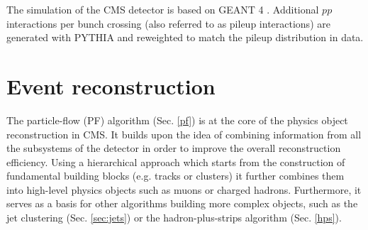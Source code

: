 The simulation of the CMS detector is based on GEANT 4 \cite{GEANT4:2002zbu}. Additional $pp$ interactions per bunch crossing (also referred to as pileup interactions) are generated with PYTHIA and reweighted to match the pileup distribution in data. 

\section{Event reconstruction}\label{sec:reco}
The particle-flow (PF) algorithm (Sec. \ref{pf}) is at the core of the physics object reconstruction in CMS. It builds upon the idea of combining information from all the subsystems of the detector in order to improve the overall reconstruction efficiency. Using a hierarchical approach which starts from the construction of fundamental building blocks (e.g. tracks or clusters) it further combines them into high-level physics objects such as muons or charged hadrons. Furthermore, it serves as a basis for other algorithms building more complex objects, such as the jet clustering (Sec. \ref{sec:jets}) or the hadron-plus-strips algorithm (Sec. \ref{hps}). 

